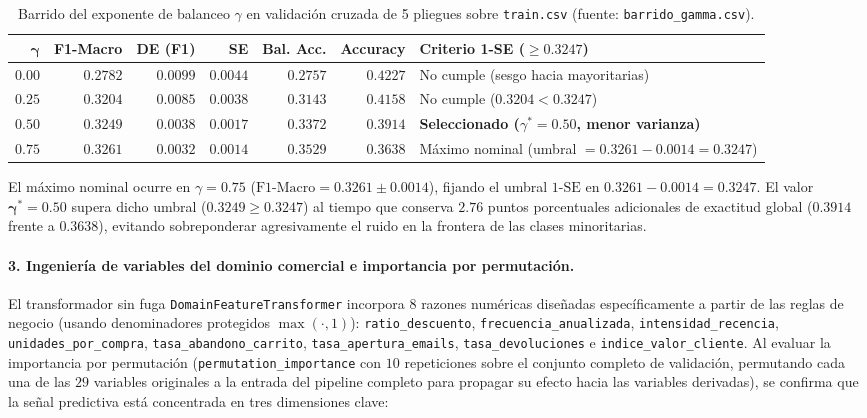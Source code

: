\documentclass[11pt,a4paper]{article}
\newcommand{\code}[1]{\texttt{\small #1}}
\begin{document}
\begin{table}[H]
\centering
\caption{Barrido del exponente de balanceo $\gamma$ en validación cruzada de 5 pliegues sobre \code{train.csv} (fuente: \code{barrido\_gamma.csv}).}
\footnotesize
\setlength{\tabcolsep}{4pt}
\begin{tabularx}{\textwidth}{rrrrrr >{\raggedright\arraybackslash}X}
\toprule
$\boldsymbol{\gamma}$ & \textbf{F1-Macro} & \textbf{DE (F1)} & \textbf{SE} & \textbf{Bal. Acc.} & \textbf{Accuracy} & \textbf{Criterio 1-SE ($\ge 0.3247$)} \\
\midrule
$0.00$ & $0.2782$ & $0.0099$ & $0.0044$ & $0.2757$ & $0.4227$ & No cumple (sesgo hacia mayoritarias) \\
$0.25$ & $0.3204$ & $0.0085$ & $0.0038$ & $0.3143$ & $0.4158$ & No cumple ($0.3204 < 0.3247$) \\
$\mathbf{0.50}$ & $\mathbf{0.3249}$ & $\mathbf{0.0038}$ & $\mathbf{0.0017}$ & $\mathbf{0.3372}$ & $\mathbf{0.3914}$ & \textbf{Seleccionado ($\gamma^* = 0.50$, menor varianza)} \\
$0.75$ & $0.3261$ & $0.0032$ & $0.0014$ & $0.3529$ & $0.3638$ & Máximo nominal (umbral $= 0.3261 - 0.0014 = 0.3247$) \\
\bottomrule
\end{tabularx}
\end{table}

El máximo nominal ocurre en $\gamma = 0.75$ ($\text{F1-Macro} = 0.3261 \pm 0.0014$), fijando el umbral $1\text{-SE}$ en $0.3261 - 0.0014 = 0.3247$. El valor $\boldsymbol{\gamma^* = 0.50}$ supera dicho umbral ($0.3249 \ge 0.3247$) al tiempo que conserva $2.76$ puntos porcentuales adicionales de exactitud global ($0.3914$ frente a $0.3638$), evitando sobreponderar agresivamente el ruido en la frontera de las clases minoritarias.

\paragraph{3. Ingeniería de variables del dominio comercial e importancia por permutación.}
El transformador sin fuga \code{DomainFeatureTransformer} incorpora $8$ razones numéricas diseñadas específicamente a partir de las reglas de negocio (usando denominadores protegidos $\max(\cdot, 1)$): \code{ratio\_descuento}, \code{frecuencia\_anualizada}, \code{intensidad\_recencia}, \code{unidades\_por\_compra}, \code{tasa\_abandono\_carrito}, \code{tasa\_apertura\_emails}, \code{tasa\_devoluciones} e \code{indice\_valor\_cliente}. Al evaluar la importancia por permutación (\code{permutation\_importance} con $10$ repeticiones sobre el conjunto completo de validación, permutando cada una de las $29$ variables originales a la entrada del pipeline completo para propagar su efecto hacia las variables derivadas), se confirma que la señal predictiva está concentrada en tres dimensiones clave:
\end{document}

